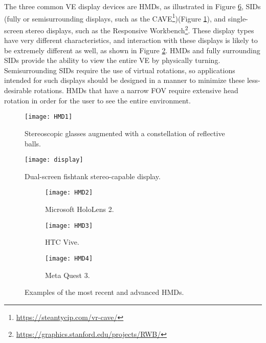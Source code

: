 The three common \gls{VE} display devices are \glspl{HMD}, as illustrated in Figure \ref{fig:HMDs}, \glspl{SID} (fully or 
semisurrounding displays, such as the \gls{CAVE}\footnote{\url{https://steantycip.com/vr-cave/}})(Figure \ref{fig:HMD1}), and single-screen stereo displays, such as the Responsive Workbench\footnote{\url{https://graphics.stanford.edu/projects/RWB/}}. 
These display types have very different characteristics, and interaction with these displays is likely to be extremely different as well, as shown in Figure \ref{fig:display}. \glspl{HMD} and fully surrounding \glspl{SID} provide the ability to view the entire \gls{VE} by physically turning. Semisurrounding \glspl{SID} require the use of virtual rotations, so applications intended for such 
displays should be designed in a manner to minimize these less-desirable rotations. \glspl{HMD} that have a narrow \gls{FOV} require extensive head rotation in order for the user to see the entire environment. 



\begin{figure}[h!]
    \centering
    \texttt{[image: HMD1]}
    \caption{Stereoscopic glasses augmented with a constellation of reflective balls.~\cite{SHERMAN2019258}} 
    \label{fig:HMD1}
\end{figure}

\begin{figure}[h!]
    \centering
    \texttt{[image: display]}
    \caption{Dual-screen fishtank stereo-capable display.~\cite{SHERMAN2019258}} 
    \label{fig:display}
\end{figure}

\begin{figure}
    \centering
    \begin{subfigure}[b]{0.3\textwidth}
        \centering
        \texttt{[image: HMD2]}
        \caption{Microsoft HoloLens 2.~\cite{headset_article}}
        \label{fig:HM}
    \end{subfigure}
    \begin{subfigure}[b]{0.3\textwidth}
        \centering
        \texttt{[image: HMD3]}
        \caption{HTC Vive.~\cite{SHERMAN2019258}}
        \label{fig:y}
    \end{subfigure}
    \hfill
    \begin{subfigure}[b]{0.3\textwidth}
        \centering
        \texttt{[image: HMD4]}
        \caption{Meta Quest 3.~\cite{article}}
        \label{fig:y}
    \end{subfigure}
       \caption{Examples of the most recent and advanced \glspl{HMD}.}
       \label{fig:HMDs}
  \end{figure}
  \FloatBarrier
  
